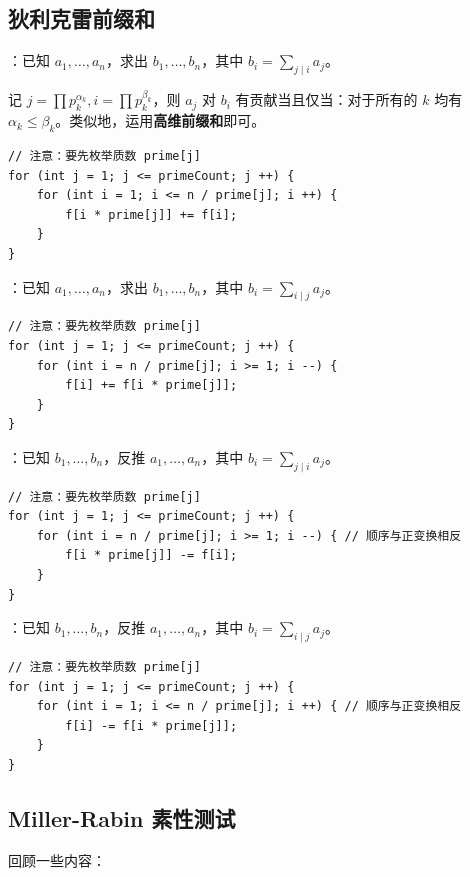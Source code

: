 \subsection{狄利克雷前缀和}

：已知 $a_1, \dots, a_n$，求出 $b_1, \dots, b_n$，其中 $b_i = \sum_{j \mid i} a_j$。

记 $j = \prod p_k^{\alpha_k}, i = \prod p_k^{\beta_k}$，则 $a_j$ 对 $b_i$ 有贡献当且仅当：对于所有的 $k$ 均有 $\alpha_k \leq \beta_k$。类似地，运用\textbf{高维前缀和}即可。

\begin{verbatim}
// 注意：要先枚举质数 prime[j]
for (int j = 1; j <= primeCount; j ++) {
    for (int i = 1; i <= n / prime[j]; i ++) {
        f[i * prime[j]] += f[i];
    }
}
\end{verbatim}

：已知 $a_1, \dots, a_n$，求出 $b_1, \dots, b_n$，其中 $b_i = \sum_{i \mid j} a_j$。

\begin{verbatim}
// 注意：要先枚举质数 prime[j]
for (int j = 1; j <= primeCount; j ++) {
    for (int i = n / prime[j]; i >= 1; i --) {
        f[i] += f[i * prime[j]];
    }
}
\end{verbatim}

：已知 $b_1, \dots, b_n$，反推 $a_1, \dots, a_n$，其中 $b_i = \sum_{j \mid i} a_j$。

\begin{verbatim}
// 注意：要先枚举质数 prime[j]
for (int j = 1; j <= primeCount; j ++) {
    for (int i = n / prime[j]; i >= 1; i --) { // 顺序与正变换相反
        f[i * prime[j]] -= f[i];
    }
}
\end{verbatim}

：已知 $b_1, \dots, b_n$，反推 $a_1, \dots, a_n$，其中 $b_i = \sum_{i \mid j} a_j$。

\begin{verbatim}
// 注意：要先枚举质数 prime[j]
for (int j = 1; j <= primeCount; j ++) {
    for (int i = 1; i <= n / prime[j]; i ++) { // 顺序与正变换相反
        f[i] -= f[i * prime[j]];
    }
}
\end{verbatim}

\subsection{Miller-Rabin 素性测试}

回顾一些内容：

